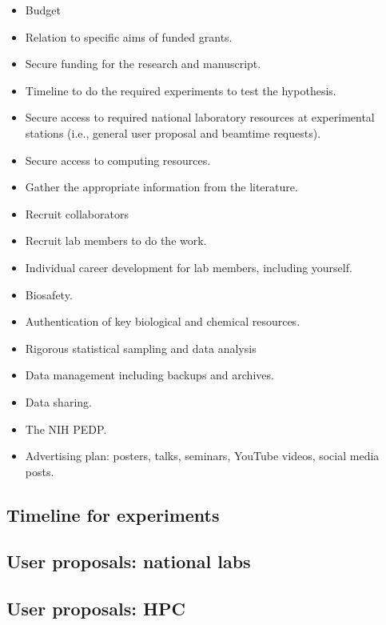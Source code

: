 \documentclass[11pt,letterpaper]{article}
\begin{document}
\begin{itemize}
\item Budget
\item Relation to specific aims of funded grants.
\item Secure funding for the research and manuscript.
\item Timeline to do the required experiments to test the hypothesis.
\item Secure access to required national laboratory resources at experimental stations (i.e., general user proposal and beamtime requests).
\item Secure access to computing resources.
\item Gather the appropriate information from the literature.
\item Recruit collaborators
\item Recruit lab members to do the work.
\item Individual career development for lab members, including yourself.
\item Biosafety.
\item Authentication of key biological and chemical resources.
\item Rigorous statistical sampling and data analysis
\item Data management including backups and archives.
\item Data sharing.
\item The NIH PEDP.
\item Advertising plan: posters, talks, seminars, YouTube videos, social media posts.
\end{itemize}




\subsection{Timeline for experiments}
\label{sec:org0a4cdb9}


\subsection{User proposals: national labs}
\label{sec:org1e1d690}


\subsection{User proposals: HPC}
\label{sec:org7d8e10e}
\end{document}
